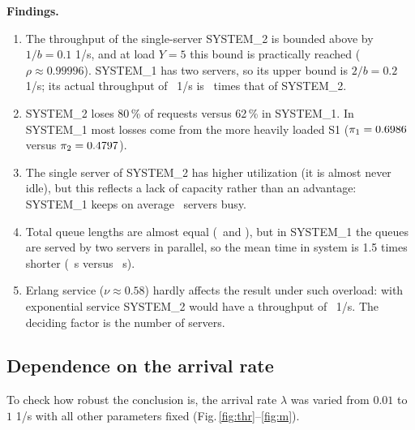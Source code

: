 \documentclass[12pt,a4paper]{article}
\begin{document}
\textbf{Findings.}
\begin{enumerate}
\item The throughput of the single-server SYSTEM\_2 is bounded above by $1/b = 0.1$ 1/s, and at load
$Y=5$ this bound is practically reached ($\rho \approx 0.99996$). SYSTEM\_1 has two servers, so its
upper bound is $2/b = 0.2$ 1/s; its actual throughput of \SoneThr\ 1/s is \Ratio\ times that of SYSTEM\_2.
\item SYSTEM\_2 loses 80\,\% of requests versus 62\,\% in SYSTEM\_1. In SYSTEM\_1 most losses come from
the more heavily loaded S1 ($\pi_1 = 0.6986$ versus $\pi_2 = 0.4797$).
\item The single server of SYSTEM\_2 has higher utilization (it is almost never idle), but this reflects
a lack of capacity rather than an advantage: SYSTEM\_1 keeps on average \SoneR\ servers busy.
\item Total queue lengths are almost equal (\SoneL\ and \StwoL), but in SYSTEM\_1 the queues are served
by two servers in parallel, so the mean time in system is 1.5 times shorter
(\SoneU\ s versus \StwoU\ s).
\item Erlang service ($\nu\approx0.58$) hardly affects the result under such overload: with exponential
service SYSTEM\_2 would have a throughput of \StwoExpThr\ 1/s. The deciding factor is the number of servers.
\end{enumerate}

\subsection{Dependence on the arrival rate}
To check how robust the conclusion is, the arrival rate $\lambda$ was varied from $0.01$ to $1$ 1/s
with all other parameters fixed (Fig.\,\ref{fig:thr}–\ref{fig:m}).
\end{document}
